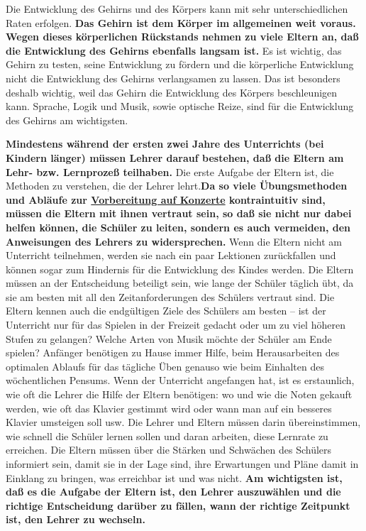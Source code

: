 Die Entwicklung des Gehirns und des Körpers kann mit sehr unterschiedlichen Raten erfolgen.
\textbf{Das Gehirn ist dem Körper im allgemeinen weit voraus.
Wegen dieses körperlichen Rückstands nehmen zu viele Eltern an, daß die Entwicklung des Gehirns ebenfalls langsam ist.}
Es ist wichtig, das Gehirn zu testen, seine Entwicklung zu fördern und die körperliche Entwicklung nicht die Entwicklung des Gehirns verlangsamen zu lassen.
Das ist besonders deshalb wichtig, weil das Gehirn die Entwicklung des Körpers beschleunigen kann.
Sprache, Logik und Musik, sowie optische Reize, sind für die Entwicklung des Gehirns am wichtigsten.

\textbf{Mindestens während der ersten zwei Jahre des Unterrichts (bei Kindern länger) müssen Lehrer darauf bestehen, daß die Eltern am Lehr- bzw. Lernprozeß teilhaben.}
Die erste Aufgabe der Eltern ist, die Methoden zu verstehen, die der Lehrer lehrt.\textbf{Da so viele Übungsmethoden und Abläufe zur \hyperref[c1iii14]{Vorbereitung auf Konzerte} kontraintuitiv sind, müssen die Eltern mit ihnen vertraut sein, so daß sie nicht nur dabei helfen können, die Schüler zu leiten, sondern es auch vermeiden, den Anweisungen des Lehrers zu widersprechen.}
Wenn die Eltern nicht am Unterricht teilnehmen, werden sie nach ein paar Lektionen zurückfallen und können sogar zum Hindernis für die Entwicklung des Kindes werden.
Die Eltern müssen an der Entscheidung beteiligt sein, wie lange der Schüler täglich übt, da sie am besten mit all den Zeitanforderungen des Schülers vertraut sind.
Die Eltern kennen auch die endgültigen Ziele des Schülers am besten -- ist der Unterricht nur für das Spielen in der Freizeit gedacht oder um zu viel höheren Stufen zu gelangen?
Welche Arten von Musik möchte der Schüler am Ende spielen?
Anfänger benötigen zu Hause immer Hilfe, beim Herausarbeiten des optimalen Ablaufs für das tägliche Üben genauso wie beim Einhalten des wöchentlichen Pensums.
Wenn der Unterricht angefangen hat, ist es erstaunlich, wie oft die Lehrer die Hilfe der Eltern benötigen: wo und wie die Noten gekauft werden, wie oft das Klavier gestimmt wird oder wann man auf ein besseres Klavier umsteigen soll usw.
Die Lehrer und Eltern müssen darin übereinstimmen, wie schnell die Schüler lernen sollen und daran arbeiten, diese Lernrate zu erreichen.
Die Eltern müssen über die Stärken und Schwächen des Schülers informiert sein, damit sie in der Lage sind, ihre Erwartungen und Pläne damit in Einklang zu bringen, was erreichbar ist und was nicht.
\textbf{Am wichtigsten ist, daß es die Aufgabe der Eltern ist, den Lehrer auszuwählen und die richtige Entscheidung darüber zu fällen, wann der richtige Zeitpunkt ist, den Lehrer zu wechseln.}

